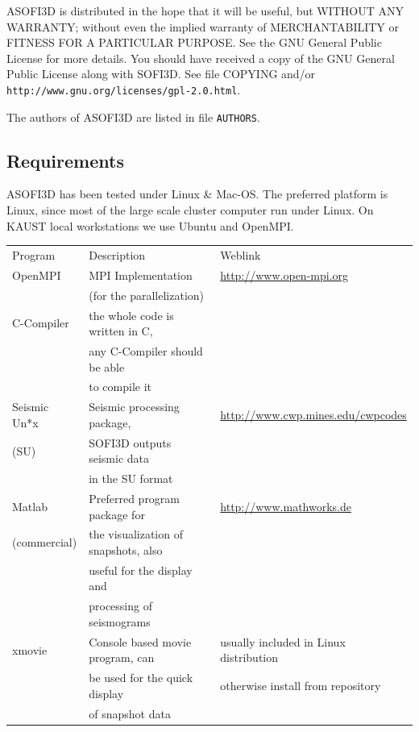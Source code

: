 \documentclass{hitec}
\begin{document}
ASOFI3D is distributed in the hope that it will be useful, but WITHOUT ANY WARRANTY; without even the implied warranty of MERCHANTABILITY or FITNESS FOR A PARTICULAR PURPOSE. See the GNU General Public License for more details. You should have received a copy of the GNU General Public License along with SOFI3D. See file COPYING and/or  \lstinline{http://www.gnu.org/licenses/gpl-2.0.html}.

The authors of ASOFI3D are listed in file  \lstinline{AUTHORS}.

\subsection{Requirements}
\label{requirements}

ASOFI3D has been tested under Linux \& Mac-OS. The preferred platform is Linux, since most of the large scale cluster computer run under Linux. On KAUST local workstations we use Ubuntu and OpenMPI.

\begin{center}
\begin{small}
\begin{tabular}{lll}
Program & Description & Weblink \\ 
OpenMPI & MPI Implementation & \url{http://www.open-mpi.org} \\
 & (for the parallelization) & \\
C-Compiler & the whole code is written in C,& \\
& any C-Compiler should be able & \\
& to compile it & \\
Seismic Un*x & Seismic processing package, & \url{http://www.cwp.mines.edu/cwpcodes} \\
(SU)  & SOFI3D outputs seismic data & \\
& in the SU format & \\
Matlab & Preferred program package for & \url{http://www.mathworks.de} \\
(commercial)& the visualization of snapshots, also  & \\
& useful for the display and & \\
& processing of seismograms & \\
xmovie & Console based movie program, can & usually included in Linux distribution\\
& be used for the quick display & otherwise install from repository\\
& of snapshot data  &
\end{tabular}
\end{small}
\end{center}
\end{document}
